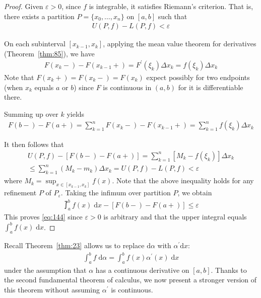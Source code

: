 \documentclass[thmcnt=section, 12pt]{my-elegantbook}
\begin{document}
\begin{proof}
    Given $\varepsilon > 0$, since $f$ is integrable,
    it satisfies Riemann's criterion.
    That is,
    there exists a
    partition $P=\{x_0, \ldots, x_n\}$ on $[a, b]$
    such that
    \begin{align*}
        U(P,f) - L(P,f) < \varepsilon
    \end{align*}

    On each subinterval $[x_{k-1}, x_k]$,
    applying the mean value theorem for derivatives
    (Theorem~\ref{thm:85}),
    we have
    \begin{align*}
        F(x_k -) - F(x_{k-1} +)
        = F^\prime(\xi_k) \Delta x_k
        = f(\xi_k) \Delta x_k
    \end{align*}
    Note that $F(x_k +) = F(x_k - ) = F(x_k)$ expect possibly
    for two endpoints (when $x_k$ equals $a$ or $b$)
    since $F$ is continuous in $(a, b)$
    for it is differentiable there.

    Summing up over $k$ yields
    \begin{align*}
        F(b-) - F(a+)
        = \sum_{k=1}^n F(x_{k} - ) - F(x_{k-1} + )
        = \sum_{k=1}^n f(\xi_k) \Delta x_k
    \end{align*}

    It then follows that
    \begin{multline*}
        U(P,f) - [F(b-) - F(a+)]
        = \sum_{k=1}^n [M_k - f(\xi_k)] \Delta x_k \\
        \leq \sum_{k=1}^n (M_k - m_k) \Delta x_k
        = U(P,f) - L(P,f)
        < \varepsilon
    \end{multline*}
    where $M_k = \sup_{x \in [x_{k-1}, x_k]} f(x)$.
    Note that the above inequality
    holds for any refinement $P$ of $P_\varepsilon$.
    Taking the infimum over partition $P$, we obtain
    \begin{align*}
        \upint_a^b f(x) \; \mathrm{d} x
        - [F(b-) - F(a+)]
        \leq \varepsilon
    \end{align*}
    This proves \eqref{eq:144} since $\varepsilon > 0$
    is arbitrary
    and that the upper integral
    equals $\int_a^b f(x) \; \mathrm{d} x$.
\end{proof}


Recall Theorem~\ref{thm:23} allows us to
replace $\mathrm{d} \alpha$ with $\alpha^\prime \mathrm{d} x$:
\begin{align*}
    \int_a^b f \; \mathrm{d} \alpha
    = \int_a^b f(x) \alpha^\prime(x) \; \mathrm{d} x
\end{align*}
under the assumption that $\alpha$ has
a continuous derivative on $[a, b]$.
Thanks to the second fundamental theorem of calculus,
we now present a stronger version of this theorem
without assuming $\alpha^\prime$ is continuous.
\end{document}
